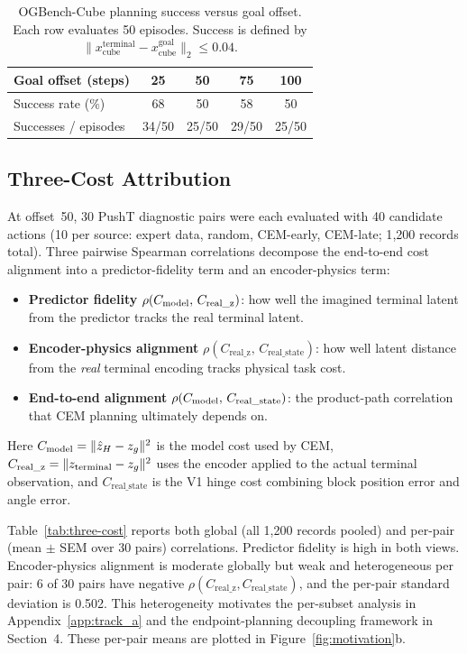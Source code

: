\begin{table}[h]
\centering
\caption{OGBench-Cube planning success versus goal offset.  Each row evaluates
50 episodes.  Success is defined by
$\|x_\text{cube}^\text{terminal} - x_\text{cube}^\text{goal}\|_2 \le 0.04$.}
\label{tab:cube-offset}
\begin{tabular}{lcccc}
\toprule
Goal offset (steps) & 25 & 50 & 75 & 100 \\
\midrule
Success rate (\%) & 68 & 50 & 58 & 50 \\
Successes / episodes & 34/50 & 25/50 & 29/50 & 25/50 \\
\bottomrule
\end{tabular}
\end{table}

\subsection{Three-Cost Attribution}
\label{app:three-cost}

At offset~50, 30 PushT diagnostic pairs were each evaluated with 40 candidate
actions (10 per source: expert data, random, CEM-early, CEM-late; 1{,}200
records total).  Three pairwise Spearman correlations decompose the end-to-end
cost alignment into a predictor-fidelity term and an encoder-physics term:

\begin{itemize}
\item \textbf{Predictor fidelity} $\rho(C_\text{model},\, C_\text{real\_z})$: how
  well the imagined terminal latent from the predictor tracks the real
  terminal latent.
\item \textbf{Encoder-physics alignment}
  $\rho(C_\text{real\_z},\, C_\text{real\_state})$: how well latent distance
  from the \emph{real} terminal encoding tracks physical task cost.
\item \textbf{End-to-end alignment}
  $\rho(C_\text{model},\, C_\text{real\_state})$: the product-path correlation that
  CEM planning ultimately depends on.
\end{itemize}

\noindent
Here $C_\text{model} = \|\hat{z}_H - z_g\|^2$ is the model cost used by CEM,
$C_\text{real\_z} = \|z_\text{terminal} - z_g\|^2$ uses the encoder
applied to the actual terminal observation, and
$C_\text{real\_state}$ is the V1 hinge cost combining block position error
and angle error.

Table~\ref{tab:three-cost} reports both global (all 1{,}200 records pooled)
and per-pair (mean $\pm$ SEM over 30 pairs) correlations.  Predictor fidelity
is high in both views.  Encoder-physics alignment is moderate globally but
weak and heterogeneous per pair: 6 of 30 pairs have negative
$\rho(C_\text{real\_z}, C_\text{real\_state})$, and the per-pair standard
deviation is 0.502.  This heterogeneity motivates the per-subset analysis in
Appendix~\ref{app:track_a} and the endpoint-planning decoupling framework in
Section~4.  These per-pair means are plotted in Figure~\ref{fig:motivation}b.

